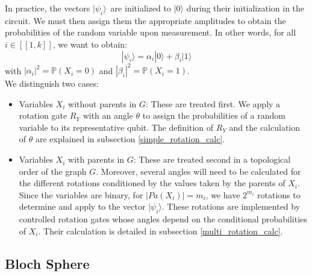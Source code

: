 In practice, the vectors $|\psi_i\rangle$\footnotemark \ are initialized to $|0\rangle$ during their initialization in the circuit. We must then assign them the appropriate amplitudes to obtain the probabilities of the random variable upon measurement. In other words, for all $i\in[\![1,k]\!]$, we want to obtain:
\[|\psi_i\rangle = \alpha_i|0\rangle + \beta_i|1\rangle\]
with $|\alpha_i|^2 = \mathbb{P}(X_i=0)$ and $|\beta_i|^2 = \mathbb{P}(X_i=1)$.
\\
We distinguish two cases:
\begin{itemize}
\item Variables $X_i$ without parents in $G$: These are treated first. We apply a rotation gate $R_Y$ with an angle $\theta$ to assign the probabilities of a random variable to its representative qubit. The definition of $R_Y$ and the calculation of $\theta$ are explained in subsection \ref{simple_rotation_calc}.
\item Variables $X_i$ with parents in $G$: These are treated second in a topological order of the graph $G$. Moreover, several angles will need to be calculated for the different rotations conditioned by the values taken by the parents of $X_i$. Since the variables are binary, for $|Pa(X_i)|=m_i$, we have $2^{m_i}$ rotations to determine and apply to the vector $|\psi_i\rangle$. These rotations are implemented by controlled rotation gates whose angles depend on the conditional probabilities of $X_i$. Their calculation is detailed in subsection \ref{multi_rotation_calc}.
\end{itemize}

\subsection{Bloch Sphere}
\label{section_Bloch}

